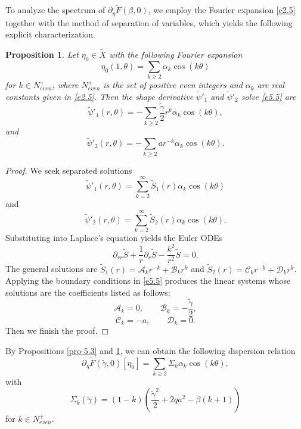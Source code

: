 \documentclass[reqno]{amsart}
\numberwithin{equation}{section}
\newtheorem{proposition}[theorem]{Proposition}
\numberwithin{equation}{section}
\numberwithin{equation}{section}
\begin{document}
To analyze the spectrum of \(\partial_{\eta} \widetilde{F}(\beta,0)\),
we employ the Fourier expansion \eqref{e2.5} together with the method of separation of variables, which yields the following explicit characterization.

\begin{proposition}\label{pro-5.4}
Let \(\eta_0 \in \widetilde{X}\) with the following Fourier expansion
\[
\eta_0(1,\theta) = \sum_{k \geq 2} \alpha_k \cos(k\theta)
\]
for $k\in N^+_{even}$, where $N^+_{even}$ is the set of positive even integers and \(\alpha_k \) are real constants given in \eqref{e2.5}. Then the shape derivative \(\widetilde{\psi}'_{1}\) and \(\widetilde{\psi}'_{2}\) solve \eqref{e5.5} are
$$
\widetilde{\psi}'_{1}(r,\theta) = -\sum_{k \geq 2}\frac{\widetilde{\gamma}}{2}r^k \alpha_k\cos(k\theta),
$$
and
$$
\widetilde{\psi}'_{2}(r,\theta) =- \sum_{k \geq 2}ar^{-k} \alpha_k\cos(k\theta).
$$
\end{proposition}

\begin{proof}
We seek separated solutions
\[\widetilde{\psi}'_{1}(r,\theta) = \sum_{k=2}^\infty \widetilde{S}_{1}(r) \alpha_k \cos(k\theta)\]
and
\[\widetilde{\psi}'_{2}(r,\theta) = \sum_{k=2}^\infty \widetilde{S}_{2}(r) \alpha_k \cos(k\theta).\]
Substituting into Laplace's equation yields the Euler ODEs
\[
\partial_{rr}\widetilde{S} + \frac{1}{r} \partial_r\widetilde{S} - \frac{k^2}{r^2}\widetilde{ S} = 0.
\]
The general solutions are \(\widetilde{S}_{1}(r) = \mathcal{A}_k r^{-k} + \mathcal{B}_k r^k\) and \(\widetilde{S}_{2}(r) = \mathcal{C}_k r^{-k} + \mathcal{D}_k r^k\). Applying the boundary conditions in \eqref{e5.5} produces the linear systems whose solutions are the coefficients listed as follows:
\[
\mathcal{A}_k = 0, \qquad
\mathcal{B}_k = -\frac{\widetilde{\gamma}}{2},
\]
\[
\mathcal{C}_k = -a, \qquad
\mathcal{D}_k = 0.
\]
Then we finish the proof.
\end{proof}

By Propositions \ref{pro-5.3} and \ref{pro-5.4}, we can obtain the following dispersion relation
\begin{equation}\label{e5.7}
\partial_\eta \widetilde{F}(\widetilde{\gamma}, 0)[\eta_0] = \sum_{k \geq 2} \Sigma_k \alpha_k \cos(k\theta),
\end{equation}
with
\begin{equation}\label{e5.8}
\Sigma_k (\widetilde{\gamma})= (1-k)\left(\frac{\widetilde{\gamma}^2}{2}+2qa^2-\beta(k+1)\right)
\end{equation}
for $k\in N^+_{even}$.
\end{document}
